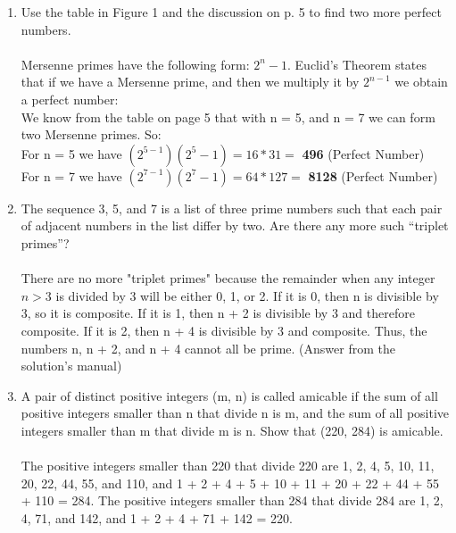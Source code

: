 \documentclass{article}
\begin{document}
\begin{enumerate}
    \item
        Use the table in Figure 1 and the discussion on p. 5 to find two more perfect
        numbers.\\\\
        Mersenne primes have the following form: $2^{n}-1$. Euclid's Theorem states that if we have a Mersenne prime, and then we multiply it by $2^{n-1}$ we obtain a perfect number:\\
        We know from the table on page 5 that with n = 5, and n = 7 we can form two Mersenne primes. So:\\
        For n = 5 we have $(2^{5-1})(2^{5}-1) = 16*31 =$ \textbf{496} (Perfect Number)\\
        For n = 7 we have $(2^{7-1})(2^{7}-1) = 64*127 =$ \textbf{8128} (Perfect Number)
    
    \item
        The sequence 3, 5, and 7 is a list of three prime numbers such that each pair of
        adjacent numbers in the list differ by two. Are there any more such “triplet
        primes”?\\\\
        There are no more "triplet primes" because the remainder when any integer $n > 3$ is divided by 3 will be either 0, 1, or 2. If it is 0, then n is divisible by 3, so it is composite. If it is 1, then n + 2 is divisible by 3 and therefore composite. If it is 2, then n + 4 is divisible by 3 and composite. Thus, the numbers n, n + 2, and n + 4 cannot all be prime. (Answer from the solution's manual)

    \item
        A pair of distinct positive integers (m, n) is called amicable if the sum of all positive integers smaller than n that divide n is m, and the sum of all positive integers smaller than m that divide m is n. Show that (220, 284) is amicable.\\\\
        The positive integers smaller than 220 that divide 220 are 1, 2, 4, 5, 10, 11, 20, 22, 44, 55, and 110, and 1 + 2 + 4 + 5 + 10 + 11 + 20 + 22 + 44 + 55 + 110 = 284. The positive integers smaller than 284 that divide 284 are 1, 2, 4, 71, and 142, and 1 + 2 + 4 + 71 + 142 = 220.
\end{enumerate}
\end{document}
